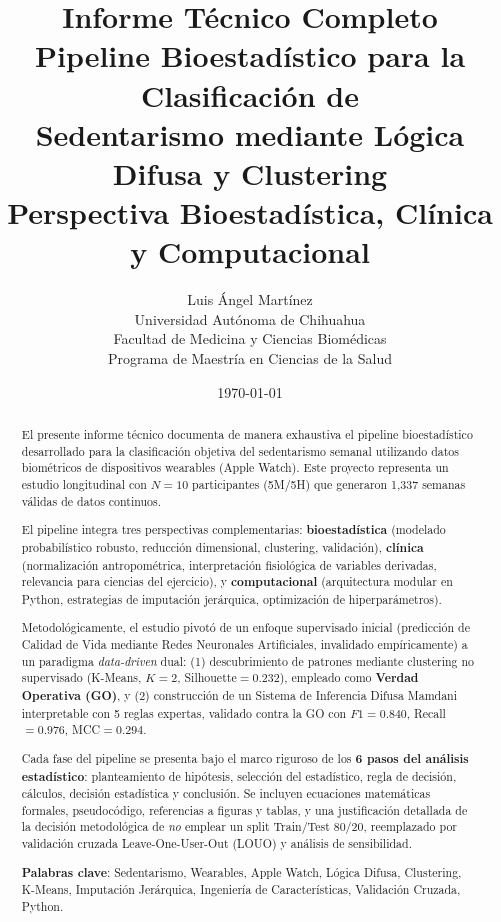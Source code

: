 \documentclass[12pt,letterpaper,twoside]{report}
\title{
    \vspace{-2cm}
    \Huge\textbf{Informe Técnico Completo} \\[0.5cm]
    \LARGE Pipeline Bioestadístico para la Clasificación de\\
    Sedentarismo mediante Lógica Difusa y Clustering\\[0.3cm]
    \Large Perspectiva Bioestadística, Clínica y Computacional
}
\author{
    \Large Luis Ángel Martínez\\[0.2cm]
    \large Universidad Autónoma de Chihuahua\\
    \large Facultad de Medicina y Ciencias Biomédicas\\[0.2cm]
    \normalsize Programa de Maestría en Ciencias de la Salud
}
\date{\today}
\begin{document}
\maketitle

\begin{abstract}
\noindent
El presente informe técnico documenta de manera exhaustiva el pipeline bioestadístico desarrollado para la clasificación objetiva del sedentarismo semanal utilizando datos biométricos de dispositivos wearables (Apple Watch). Este proyecto representa un estudio longitudinal con $N=10$ participantes (5M/5H) que generaron 1,337 semanas válidas de datos continuos.

El pipeline integra tres perspectivas complementarias: \textbf{bioestadística} (modelado probabilístico robusto, reducción dimensional, clustering, validación), \textbf{clínica} (normalización antropométrica, interpretación fisiológica de variables derivadas, relevancia para ciencias del ejercicio), y \textbf{computacional} (arquitectura modular en Python, estrategias de imputación jerárquica, optimización de hiperparámetros).

Metodológicamente, el estudio pivotó de un enfoque supervisado inicial (predicción de Calidad de Vida mediante Redes Neuronales Artificiales, invalidado empíricamente) a un paradigma \textit{data-driven} dual: (1) descubrimiento de patrones mediante clustering no supervisado (K-Means, $K=2$, Silhouette$=0.232$), empleado como \textbf{Verdad Operativa (GO)}, y (2) construcción de un Sistema de Inferencia Difusa Mamdani interpretable con 5 reglas expertas, validado contra la GO con $F1=0.840$, Recall$=0.976$, MCC$=0.294$.

Cada fase del pipeline se presenta bajo el marco riguroso de los \textbf{6 pasos del análisis estadístico}: planteamiento de hipótesis, selección del estadístico, regla de decisión, cálculos, decisión estadística y conclusión. Se incluyen ecuaciones matemáticas formales, pseudocódigo, referencias a figuras y tablas, y una justificación detallada de la decisión metodológica de \textit{no} emplear un split Train/Test 80/20, reemplazado por validación cruzada Leave-One-User-Out (LOUO) y análisis de sensibilidad.

\textbf{Palabras clave}: Sedentarismo, Wearables, Apple Watch, Lógica Difusa, Clustering, K-Means, Imputación Jerárquica, Ingeniería de Características, Validación Cruzada, Python.
\end{abstract}

\tableofcontents
\end{document}
